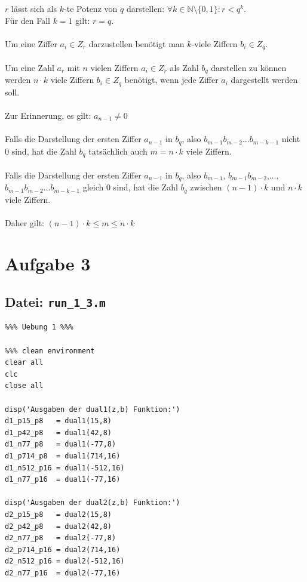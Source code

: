 \documentclass{llncs}
\begin{document}
$r$ l\"asst sich als $k$-te Potenz von $q$ darstellen: $\forall k \in \mathbb{N} \setminus \{0,1\}: r < q^k$.\\
F\"ur den Fall $k=1$ gilt: $r = q$.\\
\\
Um eine Ziffer $a_{i} \in Z_r$ darzustellen ben\"otigt man $k$-viele Ziffern $b_i \in Z_q$.\\
\\
Um eine Zahl $a_r$ mit $n$ vielen Ziffern $a_i \in Z_r$ als Zahl $b_q$ darstellen zu k\"onnen werden $n \cdot k$ viele Ziffern $b_i \in Z_q$ ben\"otigt, wenn jede Ziffer $a_i$ dargestellt werden soll.\\
\\
Zur Erinnerung, es gilt: $a_{n-1} \neq 0$\\
\\
Falls die Darstellung der ersten Ziffer $a_{n-1}$ in $b_q$, also $b_{m-1}b_{m-2}...b_{m-k-1}$ nicht $0$ sind, hat die Zahl $b_q$ tats\"achlich auch $m = n \cdot k$ viele Ziffern.\\
\\
Falls die Darstellung der ersten Ziffer $a_{n-1}$ in $b_q$, also $b_{m-1}$, $b_{m-1}b_{m-2}$,$...$,$b_{m-1}b_{m-2}...b_{m-k-1}$ gleich $0$ sind, hat die Zahl $b_q$ zwischen $(n-1) \cdot k$ und $n \cdot k$ viele Ziffern.\\
\\
Daher gilt: $(n-1) \cdot k \leq m \leq n \cdot k$

\newpage
\section*{Aufgabe 3}

\subsection*{Datei: \texttt{run\_1\_3.m}}
\begin{verbatim}
%%% Uebung 1 %%%

%%% clean environment
clear all
clc
close all

disp('Ausgaben der dual1(z,b) Funktion:')
d1_p15_p8   = dual1(15,8)
d1_p42_p8   = dual1(42,8)
d1_n77_p8   = dual1(-77,8)
d1_p714_p8  = dual1(714,16)
d1_n512_p16 = dual1(-512,16)
d1_n77_p16  = dual1(-77,16)

disp('Ausgaben der dual2(z,b) Funktion:')
d2_p15_p8   = dual2(15,8)
d2_p42_p8   = dual2(42,8)
d2_n77_p8   = dual2(-77,8)
d2_p714_p16 = dual2(714,16)
d2_n512_p16 = dual2(-512,16)
d2_n77_p16  = dual2(-77,16)
\end{verbatim}
\newpage
\end{document}
